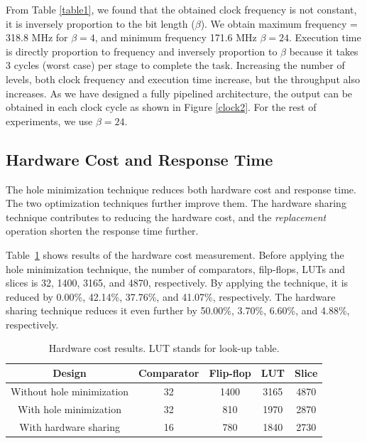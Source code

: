 From Table \ref{table1}, we found that the obtained clock frequency is not constant, it is inversely proportion to the bit length ($\beta$). 
We obtain maximum frequency = 318.8 MHz for $\beta = 4$, and minimum frequency 171.6 MHz $\beta = 24$. 
Execution time is directly proportion to frequency and inversely proportion to $\beta$ because it takes 3 cycles (worst case) per stage to complete the task. 
Increasing the number of levels, both clock frequency and execution time increase, but the throughput also increases.
As we have designed a fully pipelined architecture, the output can be obtained in each clock cycle as shown in Figure \ref{clock2}. 
For the rest of experiments, we use $\beta = 24$.

\subsection{Hardware Cost and Response Time}

The hole minimization technique reduces both hardware cost and response time.
The two optimization techniques further improve them.
The hardware sharing technique contributes to reducing the hardware cost, and the {\it replacement} operation shorten the response time further.

Table~\ref{table2} shows results of the hardware cost measurement.
Before applying the hole minimization technique, the number of comparators, filp-flops, LUTs and slices is 32, 1400, 3165, and 4870, respectively.
By applying the technique, it is reduced by 0.00\%, 42.14\%, 37.76\%, and 41.07\%, respectively.
The hardware sharing technique reduces it even further by 50.00\%, 3.70\%, 6.60\%, and 4.88\%, respectively.

\begin{table}
 \begin{center}
 \caption{Hardware cost results. LUT stands for look-up table.}
\label{table2}
\begin{tabular}{|c|c|c|c|c|}
 \hline
 Design  & Comparator  & Flip-flop & LUT &Slice \\
 \hline
 \hline
Without hole minimization & 32 & 1400 & 3165 & 4870 \\
 \hline
With hole minimization & 32 & 810 & 1970 & 2870 \\
  \hline
With hardware sharing & 16 & 780 & 1840 & 2730 \\
\hline
\end{tabular}
\end{center}
\end{table}

